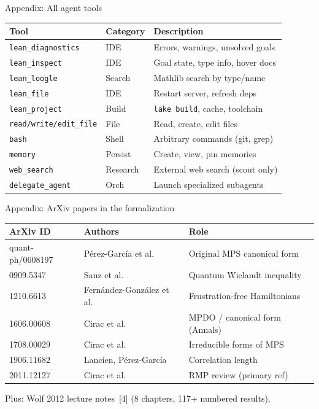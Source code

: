 \documentclass[aspectratio=169,10pt]{beamer}
\begin{document}
\begin{frame}{Appendix: All agent tools}
    {\footnotesize
    \begin{center}
    \renewcommand{\arraystretch}{1.1}
    \begin{tabular}{@{}l l p{6.5cm}@{}}
        \toprule
        \textbf{Tool} & \textbf{Category} & \textbf{Description} \\
        \midrule
        \texttt{lean\_diagnostics} & IDE & Errors, warnings, unsolved goals \\
        \texttt{lean\_inspect} & IDE & Goal state, type info, hover docs \\
        \texttt{lean\_loogle} & Search & Mathlib search by type/name \\
        \texttt{lean\_file} & IDE & Restart server, refresh deps \\
        \texttt{lean\_project} & Build & \texttt{lake build}, cache, toolchain \\
        \texttt{read/write/edit\_file} & File & Read, create, edit files \\
        \texttt{bash} & Shell & Arbitrary commands (git, grep) \\
        \texttt{memory} & Persist & Create, view, pin memories \\
        \texttt{web\_search} & Research & External web search (scout only) \\
        \texttt{delegate\_agent} & Orch & Launch specialized subagents \\
        \bottomrule
    \end{tabular}
    \end{center}
    }
\end{frame}

\begin{frame}{Appendix: ArXiv papers in the formalization}
    {\footnotesize
    \begin{center}
    \renewcommand{\arraystretch}{1.2}
    \begin{tabular}{@{}l l l@{}}
        \toprule
        \textbf{ArXiv ID} & \textbf{Authors} & \textbf{Role} \\
        \midrule
        quant-ph/0608197 & P\'erez-Garc\'ia et al.\ & Original MPS canonical form \\
        0909.5347 & Sanz et al.\ & Quantum Wielandt inequality \\
        1210.6613 & Fern\'andez-Gonz\'alez et al.\ & Frustration-free Hamiltonians \\
        1606.00608 & Cirac et al.\ & MPDO / canonical form (Annals) \\
        1708.00029 & Cirac et al.\ & Irreducible forms of MPS \\
        1906.11682 & Lancien, P\'erez-Garc\'ia & Correlation length \\
        2011.12127 & Cirac et al.\ & RMP review (primary ref) \\
        \bottomrule
    \end{tabular}
    \end{center}
    }
    \vspace{0.4em}
    Plus: Wolf 2012 lecture notes~[4] (8 chapters, 117+ numbered results).
\end{frame}
\end{document}
